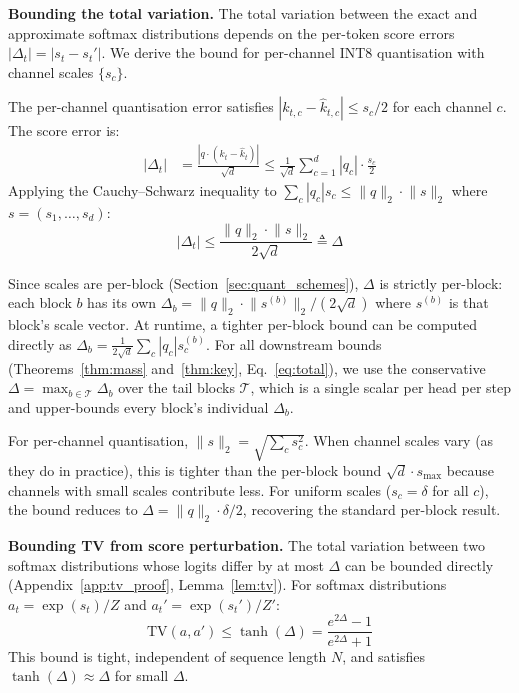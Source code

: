 \documentclass[11pt,a4paper]{article}
\theoremstyle{definition}
\theoremstyle{remark}
\newcommand{\norm}[1]{\lVert #1 \rVert}
\begin{document}
\textbf{Bounding the total variation.}  The total variation between the exact and approximate softmax distributions depends on the per-token score errors $|\Delta_t| = |s_t - s_t'|$.  We derive the bound for per-channel INT8 quantisation with channel scales $\{s_c\}$.

The per-channel quantisation error satisfies $|k_{t,c} - \hat{k}_{t,c}| \leq s_c / 2$ for each channel $c$.  The score error is:
\begin{align*}
  |\Delta_t| &= \frac{|q \cdot (k_t - \hat{k}_t)|}{\sqrt{d}} \leq \frac{1}{\sqrt{d}} \sum_{c=1}^d |q_c| \cdot \frac{s_c}{2}
\end{align*}
Applying the Cauchy--Schwarz inequality to $\sum_c |q_c| s_c \leq \norm{q}_2 \cdot \norm{s}_2$ where $s = (s_1, \ldots, s_d)$:
\begin{equation}
\label{eq:delta}
  |\Delta_t| \leq \frac{\norm{q}_2 \cdot \norm{s}_2}{2\sqrt{d}} \triangleq \Delta
\end{equation}

Since scales are per-block (Section~\ref{sec:quant_schemes}), $\Delta$ is strictly per-block: each block $b$ has its own $\Delta_b = \norm{q}_2 \cdot \norm{s^{(b)}}_2 / (2\sqrt{d})$ where $s^{(b)}$ is that block's scale vector.  At runtime, a tighter per-block bound can be computed directly as $\Delta_b = \frac{1}{2\sqrt{d}} \sum_c |q_c| s_c^{(b)}$.  For all downstream bounds (Theorems~\ref{thm:mass} and~\ref{thm:key}, Eq.~\ref{eq:total}), we use the conservative $\Delta = \max_{b \in \mathcal{T}} \Delta_b$ over the tail blocks $\mathcal{T}$, which is a single scalar per head per step and upper-bounds every block's individual $\Delta_b$.

For per-channel quantisation, $\norm{s}_2 = \sqrt{\sum_c s_c^2}$.  When channel scales vary (as they do in practice), this is tighter than the per-block bound $\sqrt{d} \cdot s_{\max}$ because channels with small scales contribute less.  For uniform scales ($s_c = \delta$ for all $c$), the bound reduces to $\Delta = \norm{q}_2 \cdot \delta / 2$, recovering the standard per-block result.

\textbf{Bounding TV from score perturbation.}  The total variation between two softmax distributions whose logits differ by at most $\Delta$ can be bounded directly (Appendix~\ref{app:tv_proof}, Lemma~\ref{lem:tv}).  For softmax distributions $a_t = \exp(s_t) / Z$ and $a_t' = \exp(s_t') / Z'$:
\begin{equation}
\label{eq:tv_bound}
  \mathrm{TV}(a, a') \leq \tanh(\Delta) = \frac{e^{2\Delta} - 1}{e^{2\Delta} + 1}
\end{equation}
This bound is tight, independent of sequence length $N$, and satisfies $\tanh(\Delta) \approx \Delta$ for small $\Delta$.
\end{document}
